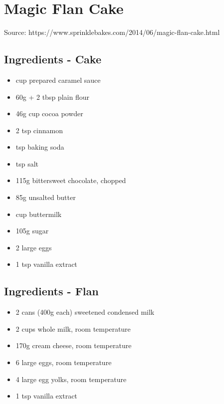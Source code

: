 \clearpage
\section{Magic Flan Cake}

  
Source: https://www.sprinklebakes.com/2014/06/magic-flan-cake.html

  \begin{multicols}{2}
    \subsection{Ingredients - Cake}
      \begin{itemize}
        \item {} cup prepared caramel sauce
        \item 60g + 2 tbsp plain flour
        \item 46g cup cocoa powder
        \item 2 tsp cinnamon
        \item {} tsp baking soda
        \item {} tsp salt
        \item 115g bittersweet chocolate, chopped
        \item 85g unsalted butter
        \item {} cup buttermilk
        \item 105g sugar
        \item 2 large eggs
        \item 1 tsp vanilla extract
      \end{itemize}
      \subsection{Ingredients - Flan}
        \begin{itemize}
          \item 2 cans (400g each) sweetened condensed milk
          \item 2 cups whole milk, room temperature
          \item 170g cream cheese, room temperature
          \item 6 large eggs, room temperature
          \item 4 large egg yolks, room temperature
          \item 1 tsp vanilla extract
        \end{itemize}
  \vfill\null
  \columnbreak

\end{multicols}
